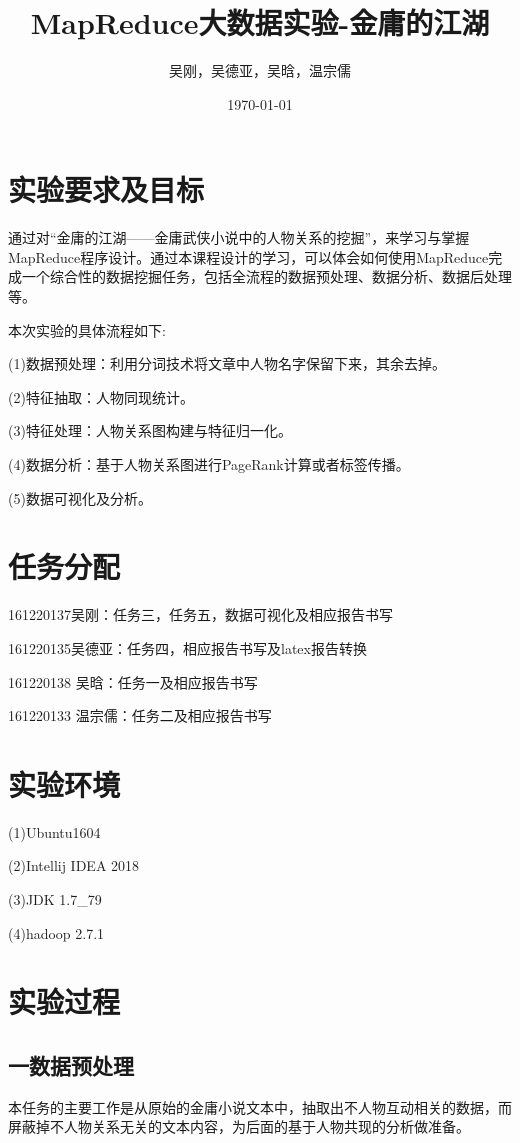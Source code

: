 \documentclass{ctexart}
\title{MapReduce大数据实验-金庸的江湖}
\author{
		吴刚，吴德亚，吴晗，温宗儒
	}
\date{\today}
\begin{document}
	\maketitle
	\renewcommand{\contentsname}{目录} %
	\tableofcontents
	\section{实验要求及目标}
	通过对“金庸的江湖——金庸武侠小说中的人物关系的挖掘”，来学习与掌握MapReduce程序设计。通过本课程设计的学习，可以体会如何使用MapReduce完成一个综合性的数据挖掘任务，包括全流程的数据预处理、数据分析、数据后处理等。\par
	本次实验的具体流程如下:\par
	(1)数据预处理：利用分词技术将文章中人物名字保留下来，其余去掉。\par
	(2)特征抽取：人物同现统计。\par
	(3)特征处理：人物关系图构建与特征归一化。\par
	(4)数据分析：基于人物关系图进行PageRank计算或者标签传播。\par
	(5)数据可视化及分析。\par
	
	\section{任务分配}
	\par 161220137\quad 吴刚\quad ：任务三，任务五，数据可视化及相应报告书写
	\par 161220135\quad 吴德亚\quad ：任务四，相应报告书写及latex报告转换
	\par 161220138 \quad 吴晗\quad	：任务一及相应报告书写
	\par 161220133 \quad 温宗儒\quad ：任务二及相应报告书写
	
	\section{实验环境}
	(1)Ubuntu1604 \par
	(2)Intellij IDEA 2018 \par
	(3)JDK 1.7\_79 \par
	(4)hadoop 2.7.1\par
	\section{实验过程}
	\subsection{一\quad 数据预处理}
	\par 本任务的主要工作是从原始的金庸小说文本中，抽取出不人物互动相关的数据，而屏蔽掉不人物关系无关的文本内容，为后面的基于人物共现的分析做准备。
\end{document}
